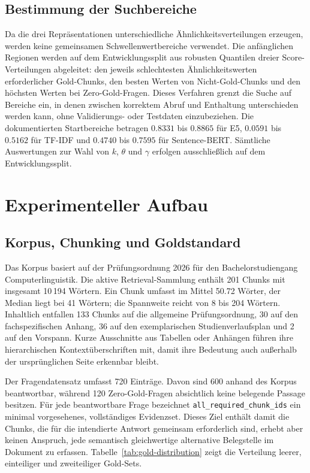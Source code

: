 \documentclass[11pt]{article}
\begin{document}
\subsection{Bestimmung der Suchbereiche}

Da die drei Repräsentationen unterschiedliche Ähnlichkeitsverteilungen erzeugen, werden keine gemeinsamen Schwellenwertbereiche verwendet. Die anfänglichen Regionen werden auf dem Entwicklungssplit aus robusten Quantilen dreier Score-Verteilungen abgeleitet: den jeweils schlechtesten Ähnlichkeitswerten erforderlicher Gold-Chunks, den besten Werten von Nicht-Gold-Chunks und den höchsten Werten bei Zero-Gold-Fragen. Dieses Verfahren grenzt die Suche auf Bereiche ein, in denen zwischen korrektem Abruf und Enthaltung unterschieden werden kann, ohne Validierungs- oder Testdaten einzubeziehen. Die dokumentierten Startbereiche betragen $0.8331$ bis $0.8865$ für E5, $0.0591$ bis $0.5162$ für TF-IDF und $0.4740$ bis $0.7595$ für Sentence-BERT. Sämtliche Auswertungen zur Wahl von $k$, $\theta$ und $\gamma$ erfolgen ausschließlich auf dem Entwicklungssplit.


\section{Experimenteller Aufbau}

\subsection{Korpus, Chunking und Goldstandard}

Das Korpus basiert auf der Prüfungsordnung 2026 für den Bachelorstudiengang Computerlinguistik. Die aktive Retrieval-Sammlung enthält 201 Chunks mit insgesamt 10{\,}194 Wörtern. Ein Chunk umfasst im Mittel 50.72 Wörter, der Median liegt bei 41 Wörtern; die Spannweite reicht von 8 bis 204 Wörtern. Inhaltlich entfallen 133 Chunks auf die allgemeine Prüfungsordnung, 30 auf den fachspezifischen Anhang, 36 auf den exemplarischen Studienverlaufsplan und 2 auf den Vorspann. Kurze Ausschnitte aus Tabellen oder Anhängen führen ihre hierarchischen Kontextüberschriften mit, damit ihre Bedeutung auch außerhalb der ursprünglichen Seite erkennbar bleibt. 

Der Fragendatensatz umfasst 720 Einträge. Davon sind 600 anhand des Korpus beantwortbar, während 120 Zero-Gold-Fragen absichtlich keine belegende Passage besitzen. Für jede beantwortbare Frage bezeichnet \texttt{all\_required\_chunk\_ids} ein minimal vorgesehenes, vollständiges Evidenzset. Dieses Ziel enthält damit die Chunks, die für die intendierte Antwort gemeinsam erforderlich sind, erhebt aber keinen Anspruch, jede semantisch gleichwertige alternative Belegstelle im Dokument zu erfassen. Tabelle~\ref{tab:gold-distribution} zeigt die Verteilung leerer, einteiliger und zweiteiliger Gold-Sets.
\end{document}
